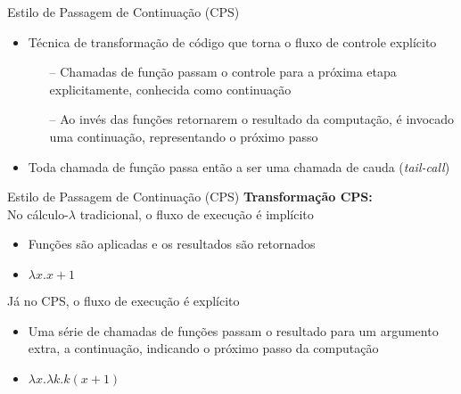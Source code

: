 \begin{frame}{Estilo de Passagem de Continuação (CPS)}
    \begin{itemize}
        \item Técnica de transformação de código que torna o fluxo de controle explícito
              \begin{itemize}
                  \item[--] Chamadas de função passam o controle para a próxima etapa explicitamente, conhecida como continuação~\cite{appel1992compiling}
                  \item[--] Ao invés das funções retornarem o resultado da computação, é invocado uma continuação, representando o próximo passo
              \end{itemize}
        \item Toda chamada de função passa então a ser uma chamada de cauda (\textit{tail-call})
    \end{itemize}
\end{frame}





\begin{frame}{Estilo de Passagem de Continuação (CPS)}
    \textbf{Transformação CPS:}\\
    No cálculo-$\lambda$ tradicional, o fluxo de execução é implícito
    \begin{itemize}
        \item Funções são aplicadas e os resultados são retornados
        \item $\lambda x. x + 1$
    \end{itemize}
    Já no CPS, o fluxo de execução é explícito
    \begin{itemize}
        \item Uma série de chamadas de funções passam o resultado para um argumento extra, a continuação, indicando o próximo passo da computação
        \item $\lambda x. \lambda k. k (x + 1)$
    \end{itemize}
\end{frame}

